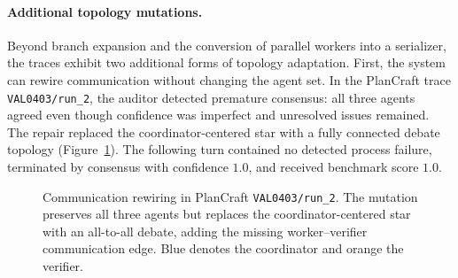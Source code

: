 
\paragraph{Additional topology mutations.}
Beyond branch expansion and the conversion of parallel workers into a
serializer, the traces exhibit two additional forms of topology adaptation.
First, the system can rewire communication without changing the agent set.
In the PlanCraft trace \texttt{VAL0403/run\_2}, the auditor detected premature
consensus: all three agents agreed even though confidence was imperfect and
unresolved issues remained.  The repair replaced the coordinator-centered
star with a fully connected debate topology (Figure~\ref{fig:mutation-debate}).
The following turn contained no detected process failure, terminated by
consensus with confidence $1.0$, and received benchmark score $1.0$.

\begin{figure}[t]
  \centering
  \caption{Communication rewiring in PlanCraft
  \texttt{VAL0403/run\_2}. The mutation preserves all three agents but replaces
  the coordinator-centered star with an all-to-all debate, adding the missing
  worker--verifier communication edge. Blue denotes the coordinator and orange
  the verifier.}
  \label{fig:mutation-debate}
\end{figure}

